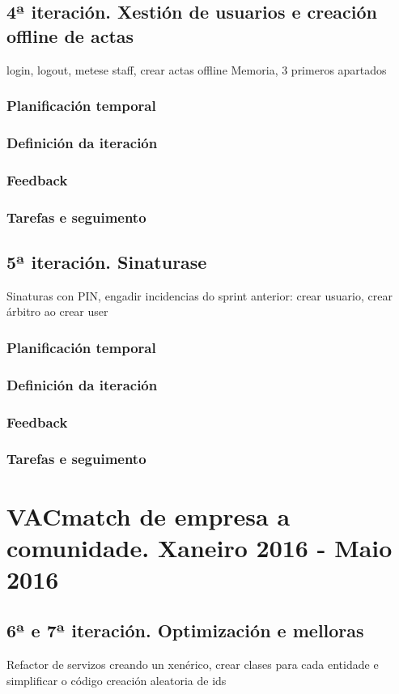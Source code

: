     \subsection{4ª iteración. Xestión de usuarios e creación offline de actas}
    login, logout, metese staff, crear actas offline
    Memoria, 3 primeros apartados
      \subsubsection{Planificación temporal}
      \subsubsection{Definición da iteración}
      \subsubsection{Feedback}
      \subsubsection{Tarefas e seguimento}

    \subsection{5ª iteración. Sinaturase}
    Sinaturas con PIN, engadir incidencias
    do sprint anterior: crear usuario, crear árbitro ao crear user
      \subsubsection{Planificación temporal}
      \subsubsection{Definición da iteración}
      \subsubsection{Feedback}
      \subsubsection{Tarefas e seguimento}


  \section{VACmatch de empresa a comunidade. Xaneiro 2016 - Maio 2016}
    \subsection{6ª e 7ª iteración. Optimización e melloras}
    Refactor de servizos creando un xenérico, crear clases para cada entidade e simplificar o código
    creación aleatoria de ids

